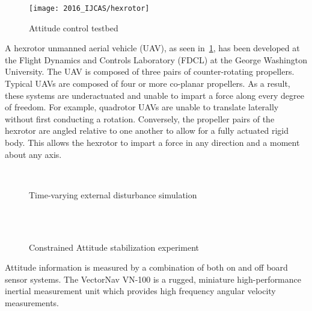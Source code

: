 \begin{figure}[htbp]
    \centering
    \texttt{[image: 2016\_IJCAS/hexrotor]}
    \caption{Attitude control testbed~\label{fig:hexrotor}}
\end{figure}
\vspace{-3mm}
A hexrotor unmanned aerial vehicle (UAV), as seen in~\cref{fig:hexrotor}, has been developed at the Flight Dynamics and Controls Laboratory (FDCL) at the George Washington University.
The UAV is composed of three pairs of counter-rotating propellers. 
Typical UAVs are composed of four or more co-planar propellers.
As a result, these systems are underactuated and unable to impart a force along every degree of freedom.
For example, quadrotor UAVs are unable to translate laterally without first conducting a rotation.
Conversely, the propeller pairs of the hexrotor are angled relative to one another to allow for a fully actuated rigid body.
This allows the hexrotor to impart a force in any direction and a moment about any axis. 
\begin{figure}[htbp]
    \centering 
    ~
    ~
    \caption{Time-varying external disturbance simulation}
    \label{fig:tv} 
\end{figure}
\begin{figure}[t]
    \centering 
    ~
    ~
    \\
    ~
    \caption{Constrained Attitude stabilization experiment}
    \label{fig:exp} 
\end{figure}
Attitude information is measured by a combination of both on and off board sensor systems.
The VectorNav VN-100 is a rugged, miniature high-performance inertial measurement unit which provides high frequency angular velocity measurements.
